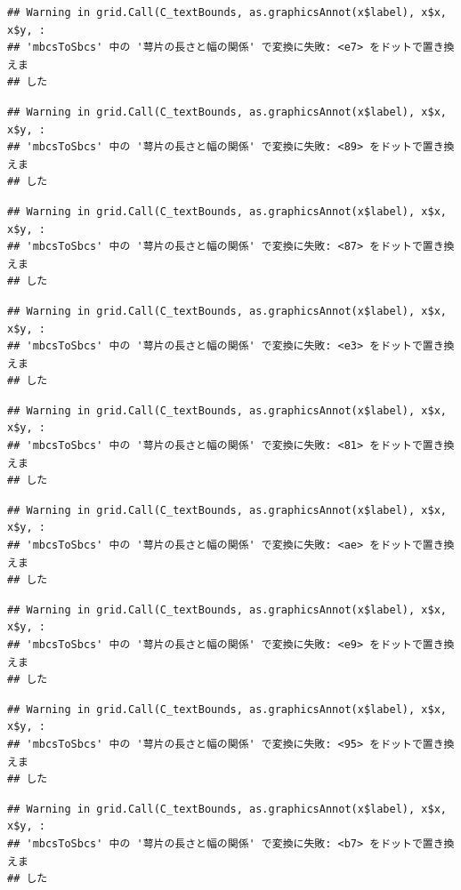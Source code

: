 \documentclass[
]{book}
\begin{document}
\begin{verbatim}
## Warning in grid.Call(C_textBounds, as.graphicsAnnot(x$label), x$x, x$y, :
## 'mbcsToSbcs' 中の '萼片の長さと幅の関係' で変換に失敗: <e7> をドットで置き換えま
## した
\end{verbatim}

\begin{verbatim}
## Warning in grid.Call(C_textBounds, as.graphicsAnnot(x$label), x$x, x$y, :
## 'mbcsToSbcs' 中の '萼片の長さと幅の関係' で変換に失敗: <89> をドットで置き換えま
## した
\end{verbatim}

\begin{verbatim}
## Warning in grid.Call(C_textBounds, as.graphicsAnnot(x$label), x$x, x$y, :
## 'mbcsToSbcs' 中の '萼片の長さと幅の関係' で変換に失敗: <87> をドットで置き換えま
## した
\end{verbatim}

\begin{verbatim}
## Warning in grid.Call(C_textBounds, as.graphicsAnnot(x$label), x$x, x$y, :
## 'mbcsToSbcs' 中の '萼片の長さと幅の関係' で変換に失敗: <e3> をドットで置き換えま
## した
\end{verbatim}

\begin{verbatim}
## Warning in grid.Call(C_textBounds, as.graphicsAnnot(x$label), x$x, x$y, :
## 'mbcsToSbcs' 中の '萼片の長さと幅の関係' で変換に失敗: <81> をドットで置き換えま
## した
\end{verbatim}

\begin{verbatim}
## Warning in grid.Call(C_textBounds, as.graphicsAnnot(x$label), x$x, x$y, :
## 'mbcsToSbcs' 中の '萼片の長さと幅の関係' で変換に失敗: <ae> をドットで置き換えま
## した
\end{verbatim}

\begin{verbatim}
## Warning in grid.Call(C_textBounds, as.graphicsAnnot(x$label), x$x, x$y, :
## 'mbcsToSbcs' 中の '萼片の長さと幅の関係' で変換に失敗: <e9> をドットで置き換えま
## した
\end{verbatim}

\begin{verbatim}
## Warning in grid.Call(C_textBounds, as.graphicsAnnot(x$label), x$x, x$y, :
## 'mbcsToSbcs' 中の '萼片の長さと幅の関係' で変換に失敗: <95> をドットで置き換えま
## した
\end{verbatim}

\begin{verbatim}
## Warning in grid.Call(C_textBounds, as.graphicsAnnot(x$label), x$x, x$y, :
## 'mbcsToSbcs' 中の '萼片の長さと幅の関係' で変換に失敗: <b7> をドットで置き換えま
## した
\end{verbatim}
\end{document}
